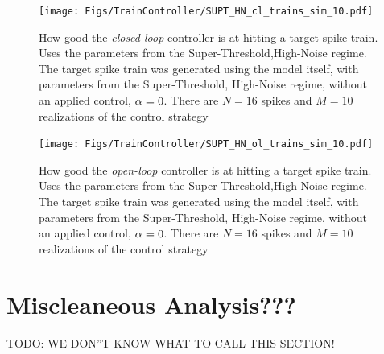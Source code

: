 \documentclass[12pt]{iopart}
\begin{document}
\begin{figure}[htp]
\begin{center}
  \texttt{[image: Figs/TrainController/SUPT\_HN\_cl\_trains\_sim\_10.pdf]}
  \caption[ ]{How good the {\sl closed-loop} controller is at hitting a target
  spike train. Uses the parameters from the Super-Threshold,High-Noise regime.
  The target spike train was generated using the model itself, with
  parameters from the Super-Threshold, High-Noise regime, without an applied
  control, ${\alpha}=0$.
  There are $N=16$ spikes and $M=10$ realizations of the control strategy}
  \label{fig:targettrain_cl_SUPT_HN}
\end{center} 
\end{figure}
\begin{figure}[htp]
\begin{center}
  \texttt{[image: Figs/TrainController/SUPT\_HN\_ol\_trains\_sim\_10.pdf]}
  \caption[ ]{How good the {\sl open-loop} controller is at hitting a target
  spike train. Uses the parameters from the Super-Threshold,High-Noise regime.
  The target spike train was generated using the model itself, with
  parameters from the Super-Threshold, High-Noise regime, without an applied
  control, ${\alpha}=0$.
  There are $N=16$ spikes and $M=10$ realizations of the control strategy}
  \label{fig:targettrain_ol_SUPT_HN}    
\end{center}
\end{figure}

\clearpage


\section{Miscleaneous Analysis???}
TODO: WE DON''T KNOW WHAT TO CALL THIS SECTION!
\end{document}
